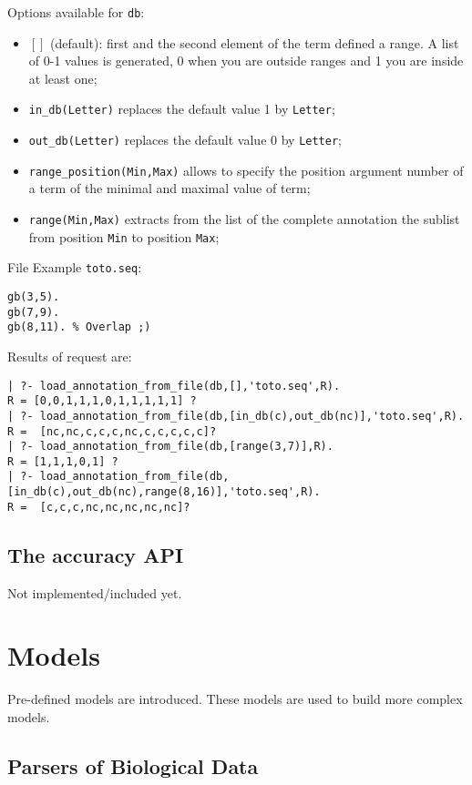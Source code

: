 \documentclass{book}
\begin{document}
\begin{itemize}
Options available for \texttt{db}:
\begin{itemize}
\item $[]$ (default): first and the second element of the term defined a range. A list of 0-1 
values is generated, 0 when you are outside ranges and 1 you are inside at least one;
\item \texttt{in\_db(Letter)} replaces the default value 1 by \texttt{Letter};
\item \texttt{out\_db(Letter)} replaces the default value 0 by \texttt{Letter};
\item \texttt{range\_position(Min,Max)} allows to specify the position argument number of a term of the minimal and maximal value
of term;
\item \texttt{range(Min,Max)} extracts from the list of the complete annotation the sublist from position \texttt{Min} to
position \texttt{Max};
\end{itemize}
File Example \texttt{toto.seq}:
\begin{verbatim}
gb(3,5).
gb(7,9).
gb(8,11). % Overlap ;)
\end{verbatim}
Results of request are:
\begin{verbatim}
| ?- load_annotation_from_file(db,[],'toto.seq',R).
R = [0,0,1,1,1,0,1,1,1,1,1] ?
| ?- load_annotation_from_file(db,[in_db(c),out_db(nc)],'toto.seq',R).
R =  [nc,nc,c,c,c,nc,c,c,c,c,c]?
| ?- load_annotation_from_file(db,[range(3,7)],R).
R = [1,1,1,0,1] ?
| ?- load_annotation_from_file(db,[in_db(c),out_db(nc),range(8,16)],'toto.seq',R).
R =  [c,c,c,nc,nc,nc,nc,nc]?
\end{verbatim}


\end{itemize}

\section{The accuracy API}

Not implemented/included yet.


\chapter{Models}

Pre-defined models are introduced.  These models are used to build more complex models.

\section{Parsers of Biological Data}
\end{document}
